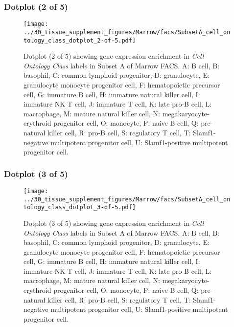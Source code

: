 \subsubsection{Dotplot (2 of 5)}
\begin{figure}[h]
\centering
\texttt{[image: ../30\_tissue\_supplement\_figures/Marrow/facs/SubsetA\_cell\_ontology\_class\_dotplot\_2-of-5.pdf]}

\caption{ Dotplot (2 of 5)  showing gene expression enrichment in \emph{Cell Ontology Class} labels in Subset A of Marrow FACS. A: B cell, B: basophil, C: common lymphoid progenitor, D: granulocyte, E: granulocyte monocyte progenitor cell, F: hematopoietic precursor cell, G: immature B cell, H: immature natural killer cell, I: immature NK T cell, J: immature T cell, K: late pro-B cell, L: macrophage, M: mature natural killer cell, N: megakaryocyte-erythroid progenitor cell, O: monocyte, P: naive B cell, Q: pre-natural killer cell, R: pro-B cell, S: regulatory T cell, T: Slamf1-negative multipotent progenitor cell, U: Slamf1-positive multipotent progenitor cell.}
\end{figure}


\clearpage

\subsubsection{Dotplot (3 of 5)}
\begin{figure}[h]
\centering
\texttt{[image: ../30\_tissue\_supplement\_figures/Marrow/facs/SubsetA\_cell\_ontology\_class\_dotplot\_3-of-5.pdf]}

\caption{ Dotplot (3 of 5)  showing gene expression enrichment in \emph{Cell Ontology Class} labels in Subset A of Marrow FACS. A: B cell, B: basophil, C: common lymphoid progenitor, D: granulocyte, E: granulocyte monocyte progenitor cell, F: hematopoietic precursor cell, G: immature B cell, H: immature natural killer cell, I: immature NK T cell, J: immature T cell, K: late pro-B cell, L: macrophage, M: mature natural killer cell, N: megakaryocyte-erythroid progenitor cell, O: monocyte, P: naive B cell, Q: pre-natural killer cell, R: pro-B cell, S: regulatory T cell, T: Slamf1-negative multipotent progenitor cell, U: Slamf1-positive multipotent progenitor cell.}
\end{figure}


\clearpage

